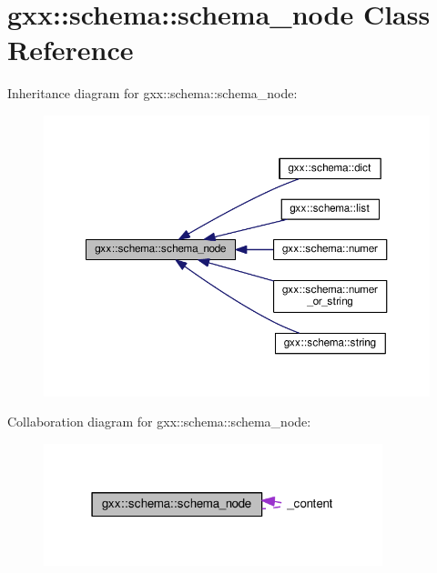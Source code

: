 \hypertarget{classgxx_1_1schema_1_1schema__node}{}\section{gxx\+:\+:schema\+:\+:schema\+\_\+node Class Reference}
\label{classgxx_1_1schema_1_1schema__node}


Inheritance diagram for gxx\+:\+:schema\+:\+:schema\+\_\+node\+:
\nopagebreak
\begin{figure}[H]
\begin{center}
\leavevmode
\includegraphics[width=350pt]{classgxx_1_1schema_1_1schema__node__inherit__graph}
\end{center}
\end{figure}


Collaboration diagram for gxx\+:\+:schema\+:\+:schema\+\_\+node\+:
\nopagebreak
\begin{figure}[H]
\begin{center}
\leavevmode
\includegraphics[width=279pt]{classgxx_1_1schema_1_1schema__node__coll__graph}
\end{center}
\end{figure}
